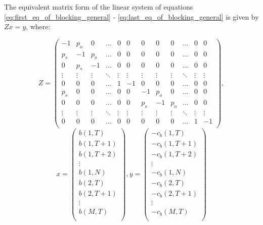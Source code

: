 The equivalent matrix form of the linear system of equations
\ref{eq:first_eq_of_blocking_general} - \ref{eq:last_eq_of_blocking_general}
is given by \(Zx=y\), where:

\newcommand{\secondallthedots}{\vdots & \vdots & \vdots & \ddots & \vdots & \vdots &
\vdots & \vdots & \vdots & \ddots & \vdots & \vdots}

\begin{equation}
    Z =
    \begin{pmatrix}
        -1 & p_o & 0 & \dots & 0 & 0 & 0 & 0 & 0 & \dots & 0 & 0 \\ %
        p_s & -1 & p_o & \dots & 0 & 0 & 0 & 0 & 0 & \dots & 0 & 0 \\ %
        0 & p_s & -1 & \dots & 0 & 0 & 0 & 0 & 0 & \dots & 0 & 0 \\ %
        \secondallthedots \\
        0 & 0 & 0 & \dots & 1 & -1 & 0 & 0 & 0 & \dots & 0 & 0 \\ %
        p_s & 0 & 0 & \dots & 0 & 0 & -1 & p_o & 0 & \dots & 0 & 0 \\ %
        0 & 0 & 0 & \dots & 0 & 0 & p_s & -1 & p_o & \dots & 0 & 0 \\ %
        \secondallthedots \\
        0 & 0 & 0 & \dots & 0 & 0 & 0 & 0 & 0 & \dots & 1 & -1 \\ %
    \end{pmatrix},
\end{equation}
\begin{equation}\label{eq:general_direct_approach_blocking_time}
    x =
    \begin{pmatrix}
        b(1,T) \\
        b(1,T+1) \\
        b(1,T+2) \\
        \vdots \\
        b(1,N) \\
        b(2,T) \\
        b(2,T+1) \\
        \vdots \\
        b(M,T) \\
    \end{pmatrix},
    y=
    \begin{pmatrix}
        -c_b(1,T) \\
        -c_b(1,T+1) \\
        -c_b(1,T+2) \\
        \vdots \\
        -c_b(1,N) \\
        -c_b(2,T) \\
        -c_b(2,T+1) \\
        \vdots \\
        -c_b(M,T) \\
    \end{pmatrix}
\end{equation}

